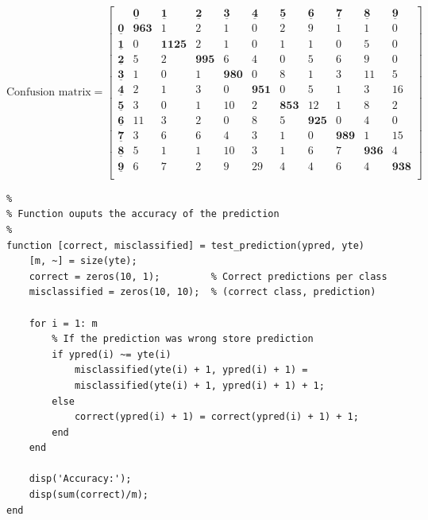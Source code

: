 \documentclass[11pt, oneside]{article}   	%
\begin{document}
 \[
  \text{Confusion matrix} =
  \left[ {\begin{array}{ccccccccccc}
   & \underline{\textbf{0}} & \underline{\textbf{1}} & \underline{\textbf{2}} & \underline{\textbf{3}} & \underline{\textbf{4}} & \underline{\textbf{5}} & \underline{\textbf{6}} & \underline{\textbf{7}} & \underline{\textbf{8}} & \underline{\textbf{9}}\\
   \underline{\textbf{0}} & \textbf{963} & 1 & 2 & 1 & 0 & 2 & 9 & 1 & 1 & 0\\
   \underline{\textbf{1}} & 0 & \textbf{1125} & 2 & 1 & 0 & 1 & 1 & 0 & 5 & 0\\
   \underline{\textbf{2}} & 5 & 2 & \textbf{995} & 6 & 4 & 0 & 5 & 6 & 9 & 0\\
   \underline{\textbf{3}} & 1 & 0 & 1 & \textbf{980} & 0 & 8 & 1 & 3 & 11 & 5\\
   \underline{\textbf{4}} & 2 & 1 & 3 & 0 & \textbf{951} & 0 & 5 & 1 & 3 & 16\\
   \underline{\textbf{5}} & 3 & 0 & 1 & 10 & 2 & \textbf{853} & 12 & 1 & 8 & 2\\
   \underline{\textbf{6}} & 11 & 3 & 2 & 0 & 8 & 5 & \textbf{925} & 0 & 4 & 0\\
   \underline{\textbf{7}} & 3 & 6 & 6 & 4 & 3 & 1 & 0 & \textbf{989} & 1 & 15\\
   \underline{\textbf{8}} & 5 & 1 & 1 & 10 & 3 & 1 & 6 & 7 & \textbf{936} & 4\\
   \underline{\textbf{9}} & 6 & 7 & 2 & 9 & 29 & 4 & 4 & 6 & 4 & \textbf{938}\\
  \end{array} } \right]
\]

\newpage{}
\begin{verbatim}
%
% Function ouputs the accuracy of the prediction
%
function [correct, misclassified] = test_prediction(ypred, yte)
    [m, ~] = size(yte);
    correct = zeros(10, 1);         % Correct predictions per class
    misclassified = zeros(10, 10);  % (correct class, prediction)
    
    for i = 1: m
        % If the prediction was wrong store prediction
        if ypred(i) ~= yte(i)
            misclassified(yte(i) + 1, ypred(i) + 1) = 
            misclassified(yte(i) + 1, ypred(i) + 1) + 1;
        else
            correct(ypred(i) + 1) = correct(ypred(i) + 1) + 1;
        end
    end
    
    disp('Accuracy:');
    disp(sum(correct)/m);
end
\end{verbatim}
\newpage{}
\end{document}
